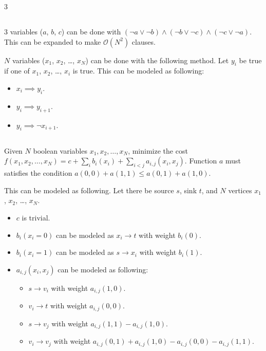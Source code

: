 \documentclass[landscape, 8pt, a4paper, oneside]{extarticle}
\begin{document}
\begin{multicols*}{3}
\subsection{}
$3$ variables ($a$, $b$, $c$) can be done with $(\neg a \vee \neg b) \wedge (\neg b \vee \neg c) \wedge (\neg c \vee \neg a)$. This can be expanded to make $\mathcal O(N^2)$ clauses.

$N$ variables ($x_1$, $x_2$, \ldots, $x_N$) can be done with the following method. Let $y_i$ be true if one of $x_1$, $x_2$, \ldots, $x_i$ is true. This can be modeled as following:
\begin{itemize}
	\item $x_i \implies y_i$.
	\item $y_i \implies y_{i+1}$.
	\item $y_i \implies \neg x_{i+1}$.
\end{itemize}
\subsection{}
Given $N$ boolean variables $x_{1}, x_{2}, \ldots, x_{N}$, minimize the cost $f(x_1, x_2, \ldots, x_N) = c + \sum_{i} b_i(x_i) + \sum_{i<j} a_{i,j}(x_i, x_j)$.
Function $a$ must satisfies the condition $a(0,0) + a(1,1) \leq a(0,1) + a(1,0)$.

This can be modeled as following. Let there be source $s$, sink $t$, and $N$ vertices $x_1$, $x_2$, \ldots, $x_N$.
\begin{itemize}
	\item $c$ is trivial.
	\item $b_i(x_i = 0)$ can be modeled as $x_i \to t$ with weight $b_i(0)$.
	\item $b_i(x_i = 1)$ can be modeled as $s \to x_i$ with weight $b_i(1)$.
	\item $a_{i,j}(x_i, x_j)$ can be modeled as following:
	\begin{itemize}
		\item $s \to v_i$ with weight $a_{i,j}(1,0)$.
		\item $v_i \to t$ with weight $a_{i,j}(0,0)$.
		\item $s \to v_j$ with weight $a_{i,j}(1,1)-a_{i,j}(1,0)$.
		\item $v_i \to v_j$ with weight $a_{i,j}(0,1)+a_{i,j}(1,0)-a_{i,j}(0,0)-a_{i,j}(1,1)$.
	\end{itemize}
\end{itemize}


\end{multicols*}
\end{document}
